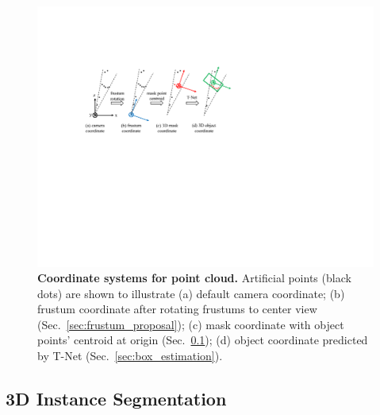 \begin{figure}[t!]
    \centering
    \includegraphics[width=0.95\linewidth]{fig/coordinate.pdf}
    \caption{\textbf{Coordinate systems for point cloud.} Artificial points (black dots) are shown to illustrate (a) default camera coordinate; (b) frustum coordinate after rotating frustums to center view (Sec.~\ref{sec:frustum_proposal}); (c) mask coordinate with object points' centroid at origin (Sec.~\ref{sec:instance_seg}); (d) object coordinate predicted by T-Net (Sec.~\ref{sec:box_estimation}).
    }
    \label{fig:coordinate}
\end{figure}

\subsection{3D Instance Segmentation}
\label{sec:instance_seg}


